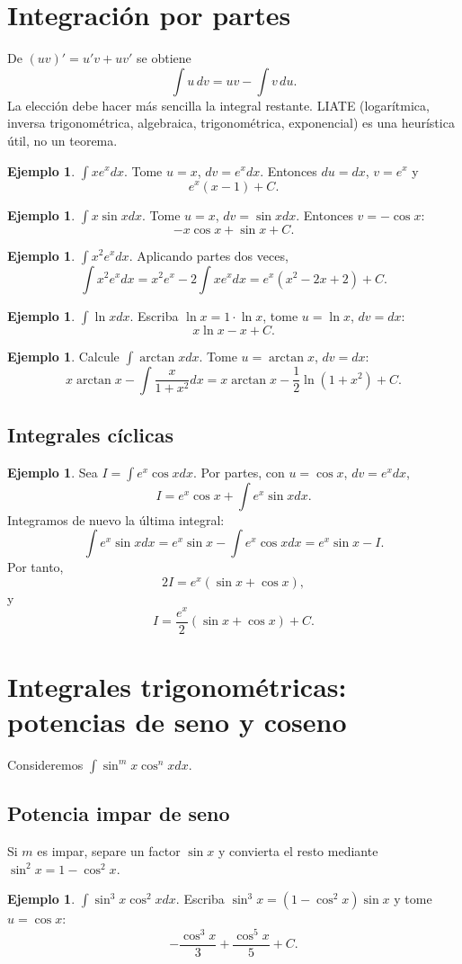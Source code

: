 \documentclass[12pt]{article}
\theoremstyle{definition}\newtheorem{definicion}[teorema]{Definición}\newtheorem{ejemplo}[teorema]{Ejemplo}\newtheorem{ejercicio}[teorema]{Ejercicio}
\theoremstyle{remark}\newtheorem*{observacion}{Observación}\newtheorem*{advertencia}{Advertencia}\newtheorem*{estrategia}{Estrategia}
\begin{document}
\section{Integración por partes}
De $(uv)'=u'v+uv'$ se obtiene
\[\boxed{\int u\,dv=uv-\int v\,du}.\]
La elección debe hacer más sencilla la integral restante. LIATE (logarítmica, inversa trigonométrica, algebraica, trigonométrica, exponencial) es una heurística útil, no un teorema.
\begin{ejemplo}$\int xe^xdx$. Tome $u=x$, $dv=e^xdx$. Entonces $du=dx$, $v=e^x$ y
\[\boxed{e^x(x-1)+C}.\]\end{ejemplo}
\begin{ejemplo}$\int x\sin xdx$. Tome $u=x$, $dv=\sin xdx$. Entonces $v=-\cos x$:
\[\boxed{-x\cos x+\sin x+C}.\]\end{ejemplo}
\begin{ejemplo}$\int x^2e^xdx$. Aplicando partes dos veces,
\[\int x^2e^xdx=x^2e^x-2\int xe^xdx=\boxed{e^x(x^2-2x+2)+C}.\]\end{ejemplo}
\begin{ejemplo}$\int\ln xdx$. Escriba $\ln x=1\cdot\ln x$, tome $u=\ln x$, $dv=dx$:
\[\boxed{x\ln x-x+C}.\]\end{ejemplo}
\begin{ejemplo}Calcule $\int\arctan xdx$. Tome $u=\arctan x$, $dv=dx$:
\[x\arctan x-\int\frac{x}{1+x^2}dx=\boxed{x\arctan x-\frac12\ln(1+x^2)+C}.\]\end{ejemplo}
\subsection{Integrales cíclicas}
\begin{ejemplo}Sea $I=\int e^x\cos xdx$. Por partes, con $u=\cos x$, $dv=e^xdx$,
\[I=e^x\cos x+\int e^x\sin xdx.\]
Integramos de nuevo la última integral:
\[\int e^x\sin xdx=e^x\sin x-\int e^x\cos xdx=e^x\sin x-I.\]
Por tanto,
\[2I=e^x(\sin x+\cos x),\]
y
\[\boxed{I=\frac{e^x}{2}(\sin x+\cos x)+C}.\]\end{ejemplo}

\section{Integrales trigonométricas: potencias de seno y coseno}
Consideremos $\int\sin^m x\cos^n xdx$.
\subsection{Potencia impar de seno}
Si $m$ es impar, separe un factor $\sin x$ y convierta el resto mediante $\sin^2x=1-\cos^2x$.
\begin{ejemplo}$\int\sin^3x\cos^2x dx$. Escriba $\sin^3x=(1-\cos^2x)\sin x$ y tome $u=\cos x$:
\[\boxed{-\frac{\cos^3x}{3}+\frac{\cos^5x}{5}+C}.\]\end{ejemplo}
\end{document}
